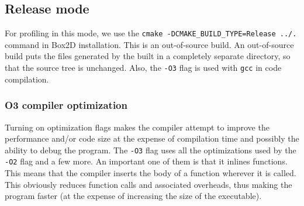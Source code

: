 \documentclass[11pt,english]{article}
\begin{document}
\subsection{Release mode}
\indent 
\par{For profiling in this mode, we use the \verb+cmake -DCMAKE_BUILD_TYPE=Release ../.+ command in Box2D installation. This is an out-of-source build.  An out-of-source build puts the files generated by the built in a completely separate directory, so that the source tree is unchanged. Also, the \verb+-O3+ flag is used with \verb+gcc+ in code compilation.}
\subsubsection{O3 compiler optimization}
\indent 
\par{Turning on optimization flags makes the compiler attempt to improve the performance and/or code size at the expense of compilation time and possibly the ability to debug the program. The \verb+-O3+ flag uses all the optimizations used by the \verb+-O2+ flag and a few more. An important one of them is that it inlines functions. This means that the compiler inserts the body of a function wherever it is called. This obviously reduces function calls and associated overheads, thus making the program faster (at the expense of increasing the size of the executable). }
\end{document}
